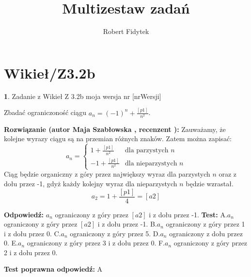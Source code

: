 \documentclass[12pt, a4paper]{article}
\title{Multizestaw zadań}
\author{Robert Fidytek}
\date{}
\theoremstyle{definition} %
\newtheorem{zad}{}
\newcommand{\kategoria}[1]{\section{#1}} %
\newcommand{\zadStart}[1]{\begin{zad}#1\newline} %
\newcommand{\zadStop}{\end{zad}}   %
\newcommand{\rozwStart}[2]{\noindent \textbf{Rozwiązanie (autor #1 , recenzent #2): }\newline} %
\newcommand{\rozwStop}{\newline}                                            %
\newcommand{\odpStart}{\noindent \textbf{Odpowiedź:}\newline}    %
\newcommand{\odpStop}{\newline}                                             %
\newcommand{\testStart}{\noindent \textbf{Test:}\newline} %
\newcommand{\testStop}{\newline} %
\newcommand{\kluczStart}{\noindent \textbf{Test poprawna odpowiedź:}\newline} %
\newcommand{\kluczStop}{\newline} %
\begin{document}
\maketitle


\kategoria{Wikieł/Z3.2b}
\zadStart{Zadanie z Wikieł Z 3.2b moja wersja nr [nrWersji]}


Zbadać ograniczoność ciągu $a_{n}=(-1)^{n}+\frac{[p1]}{n^{2}}$.

\zadStop

\rozwStart{Maja Szabłowska}{}
Zauważamy, że kolejne wyrazy ciągu są na przemian różnych znaków.
Zatem można zapisać:
$$
a_{n}=\left\{ \begin{array}{ll}
1+\frac{[p1]}{n^{2}} & \textrm{dla parzystych $n$}\\
-1+\frac{[p1]}{n^{2}} & \textrm{dla nieparzystych $n$}
\end{array} \right.
$$
Ciąg będzie organiczny z góry przez największy wyraz dla parzystych $n$ oraz z dołu przez -1, gdyż każdy kolejny wyraz dla nieparzystych $n$ będzie wzrastał.
$$a_{2}=1+\frac{[p1]}{4}=[a2]$$


\rozwStop


\odpStart
$a_{n}$ ograniczony z góry przez $[a2]$ i z dołu przez -1.
\odpStop
\testStart
A.$a_{n}$ ograniczony z góry przez $[a2]$ i z dołu przez -1.
B.$a_{n}$ ograniczony z góry przez 1 i z dołu przez 0.
C.$a_{n}$ ograniczony z góry przez 5.
D.$a_{n}$ ograniczony z dołu przez 0.
E.$a_{n}$ ograniczony z góry przez 3 i z dołu przez 0.
F.$a_{n}$ ograniczony z góry przez 2 i z dołu przez 0.


\testStop
\kluczStart
A
\kluczStop
\end{document}
